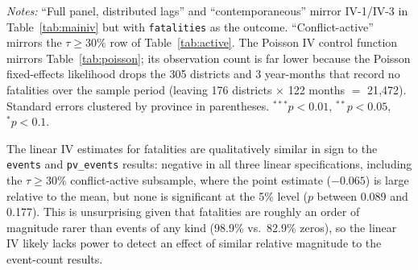 \documentclass[12pt]{article}
\begin{document}
\begin{table}[H]
\centering
\caption{Fatalities: IV estimates across specifications}
\label{tab:fatalities}
\begin{minipage}{0.95\textwidth}
\vspace{4pt}
\footnotesize \emph{Notes:} ``Full panel, distributed lags'' and ``contemporaneous'' mirror IV-1/IV-3 in Table~\ref{tab:mainiv} but with \texttt{fatalities} as the outcome. ``Conflict-active'' mirrors the $\tau \geq 30\%$ row of Table~\ref{tab:active}. The Poisson IV control function mirrors Table~\ref{tab:poisson}; its observation count is far lower because the Poisson fixed-effects likelihood drops the 305 districts and 3 year-months that record no fatalities over the sample period (leaving 176 districts $\times$ 122 months $=$ 21{,}472). Standard errors clustered by province in parentheses. $^{***}p<0.01$, $^{**}p<0.05$, $^{*}p<0.1$.
\end{minipage}
\end{table}

The linear IV estimates for fatalities are qualitatively similar in sign to the \texttt{events} and \texttt{pv\_events} results: negative in all three linear specifications, including the $\tau \geq 30\%$ conflict-active subsample, where the point estimate ($-0.065$) is large relative to the mean, but none is significant at the 5\% level ($p$ between 0.089 and 0.177). This is unsurprising given that fatalities are roughly an order of magnitude rarer than events of any kind (98.9\% vs.\ 82.9\% zeros), so the linear IV likely lacks power to detect an effect of similar relative magnitude to the event-count results.
\end{document}
